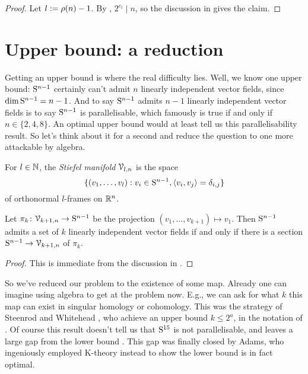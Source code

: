 \begin{proof}
  Let $l \ce \rho(n)-1$. By , $2^{e_l} \mid n$, so the
  discussion in  gives the claim.
\end{proof}


\section{Upper bound: a reduction}

Getting an upper bound is where the real difficulty lies. Well, we
know one upper bound: $\S^{n-1}$ certainly can't admit $n$ linearly
independent vector fields, since $\dim \S^{n-1} = n - 1$. And to say
$\S^{n-1}$ admits $n-1$ linearly independent vector fields is to say
$\S^{n-1}$ is parallelisable, which famously is true if and only if $n
\in \{2,4,8\}$. An optimal upper bound would at least tell us this
parallelisability result. So let's think about it for a second and
reduce the question to one more attackable by algebra.

\begin{definition}
  \label{stiefel}
  For $l \in \N$, the \emph{Stiefel manifold} $\V_{l,n}$ is the space
  \[
  \{(v_1,\ldots,v_l) : v_i \in \S^{n-1}, \langle v_i, v_j \rangle =
  \delta_{i,j}\}
  \]
  of orthonormal $l$-frames on $\R^n$.
\end{definition}

\begin{lemma}
  \label{section-reduction}
  Let $\pi_k \c \V_{k+1,n} \to \S^{n-1}$ be the projection
  $(v_1,\ldots,v_{k+1}) \mapsto v_1$. Then $\S^{n-1}$ admits a set of
  $k$ linearly independent vector fields if and only if there is a
  section $\S^{n-1} \to \V_{k+1,n}$ of $\pi_k$.
\end{lemma}

\begin{proof}
  This is immediate from the discussion in .
\end{proof}

So we've reduced our problem to the existence of some map. Already one
can imagine using algebra to get at the problem now. E.g., we can ask
for what $k$ this map can exist in singular homology or
cohomology. This was the strategy of Steenrod and Whitehead
\cite{steenrod-vfields}, who achieve an upper bound $k \le 2^a$, in
the notation of . Of course this result doesn't
tell us that $\S^{15}$ is not parallelisable, and leaves a large gap
from the lower bound . This gap was finally
closed by Adams, who ingeniously employed K-theory instead to show the
lower bound  is in fact optimal.


